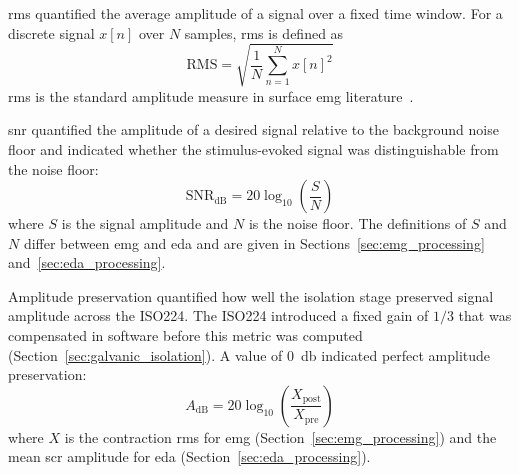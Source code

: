 \gls{rms} quantified the average amplitude of a signal over a fixed time window. For a discrete signal $x[n]$ over $N$ samples, \gls{rms} is defined as
\begin{equation}
    \text{RMS} = \sqrt{\frac{1}{N}\sum_{n=1}^{N} x[n]^2}
    \label{eq:rms}
\end{equation}
\gls{rms} is the standard amplitude measure in surface \gls{emg} literature~\cite{kamen_essentials_2010}.

\gls{snr} quantified the amplitude of a desired signal relative to the background noise floor and indicated whether the stimulus-evoked signal was distinguishable from the noise floor:
\begin{equation}
    \text{SNR}_\text{dB} = 20\log_{10}\left(\frac{S}{N}\right)
    \label{eq:snr}
\end{equation}
where $S$ is the signal amplitude and $N$ is the noise floor. The definitions of $S$ and $N$ differ between \gls{emg} and \gls{eda} and are given in Sections~\ref{sec:emg_processing} and~\ref{sec:eda_processing}.

Amplitude preservation quantified how well the isolation stage preserved signal amplitude across the ISO224. The ISO224 introduced a fixed gain of $1/3$ that was compensated in software before this metric was computed (Section~\ref{sec:galvanic_isolation}). A value of \SI{0}{\decibel} indicated perfect amplitude preservation:
\begin{equation}
    A_\text{dB} = 20\log_{10}\left(\frac{X_\text{post}}{X_\text{pre}}\right)
    \label{eq:amplitude_preservation}
\end{equation}
where $X$ is the contraction \gls{rms} for \gls{emg} (Section~\ref{sec:emg_processing}) and the mean \gls{scr} amplitude for \gls{eda} (Section~\ref{sec:eda_processing}).

